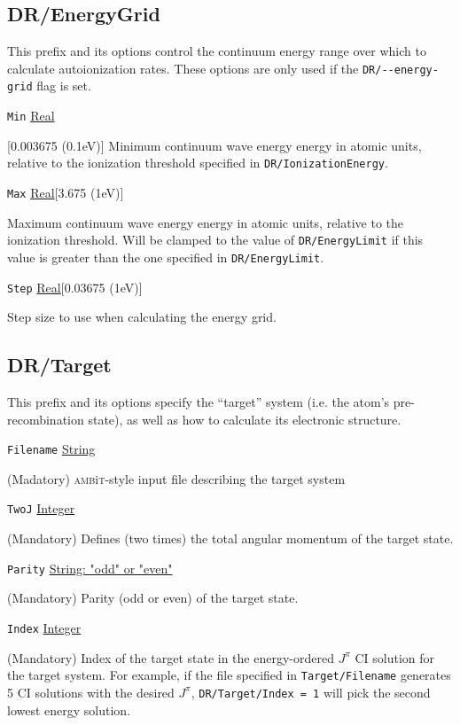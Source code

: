 \documentclass{report}
\newcommand{\ambit}{\textsc{amb}{\footnotesize i}\textsc{t}}
\begin{document}
\subsection{DR/EnergyGrid}
This prefix and its options control the continuum energy range over which to calculate autoionization
rates. These options are only used if the \texttt{DR/{-}{-}energy-grid} flag is set.

\texttt{Min} \uline{Real}
\begin{adjustwidth}{1cm}{}[0.003675 (0.1eV)]
Minimum continuum wave energy energy in atomic units, relative to the ionization threshold specified in
\texttt{DR/IonizationEnergy}.
\end{adjustwidth}

\texttt{Max} \uline{Real}[3.675 (1eV)]
\begin{adjustwidth}{1cm}{}
Maximum continuum wave energy energy in atomic units, relative to the ionization threshold. Will be
clamped to the value of \texttt{DR/EnergyLimit} if this value is greater than the one specified in
\texttt{DR/EnergyLimit}.
\end{adjustwidth}

\texttt{Step} \uline{Real}[0.03675 (1eV)]
\begin{adjustwidth}{1cm}{}
Step size to use when calculating the energy grid.
\end{adjustwidth}

\subsection{DR/Target}
This prefix and its options specify the ``target'' system (i.e. the atom's pre-recombination state), as
well as how to calculate its electronic structure.

\texttt{Filename} \uline{String}
\begin{adjustwidth}{1cm}{}
(Madatory) \ambit-style input file describing the target system
\end{adjustwidth}

\texttt{TwoJ} \uline{Integer}
\begin{adjustwidth}{1cm}{}
(Mandatory) Defines (two times) the total angular momentum of the target state.
\end{adjustwidth}

\texttt{Parity} \uline{String: "odd" or "even"}
\begin{adjustwidth}{1cm}{}
(Mandatory) Parity (odd or even) of the target state.
\end{adjustwidth}

\texttt{Index} \uline{Integer}
\begin{adjustwidth}{1cm}{}
(Mandatory) Index of the target state in the energy-ordered $J^{\pi}$ CI solution for the target system. 
For example, if the file specified in \texttt{Target/Filename} generates 5 CI solutions with the desired
$J^{\pi}$, \texttt{DR/Target/Index = 1} will pick the second lowest energy solution.
\end{adjustwidth}
\end{document}
